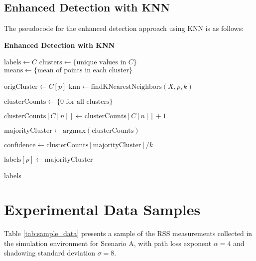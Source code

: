 \subsection{Enhanced Detection with KNN}
\label{app:knn}

The pseudocode for the enhanced detection approach using KNN is as follows:

\begin{algorithm}[H]
\caption{\textbf{Enhanced Detection with KNN}}
\label{alg:enhanced_knn}
\begin{algorithmic}[1]

    \State $\text{labels} \gets C$ 
    \State $\text{clusters} \gets \{\text{unique values in } C\}$
    \State $\text{means} \gets \{\text{mean of points in each cluster}\}$
    
        \State $\text{origCluster} \gets C[p]$
        \State $\text{knn} \gets \text{findKNearestNeighbors}(X, p, k)$
        
        \State $\text{clusterCounts} \gets \{0 \text{ for all clusters}\}$
        
            \State $\text{clusterCounts}[C[n]] \gets \text{clusterCounts}[C[n]] + 1$
        \EndFor
        
        \State $\text{majorityCluster} \gets \text{argmax}(\text{clusterCounts})$
        
            \State $\text{confidence} \gets \text{clusterCounts}[\text{majorityCluster}] / k$
            
                \State $\text{labels}[p] \gets \text{majorityCluster}$
            \EndIf
        \EndIf
    \EndFor
    
    \State \Return labels
\EndFunction
\end{algorithmic}
\end{algorithm}

\section{Experimental Data Samples}
\label{app:data}

Table \ref{tab:sample_data} presents a sample of the RSS measurements collected in the simulation environment for Scenario A, with path loss exponent $\alpha = 4$ and shadowing standard deviation $\sigma = 8$.

